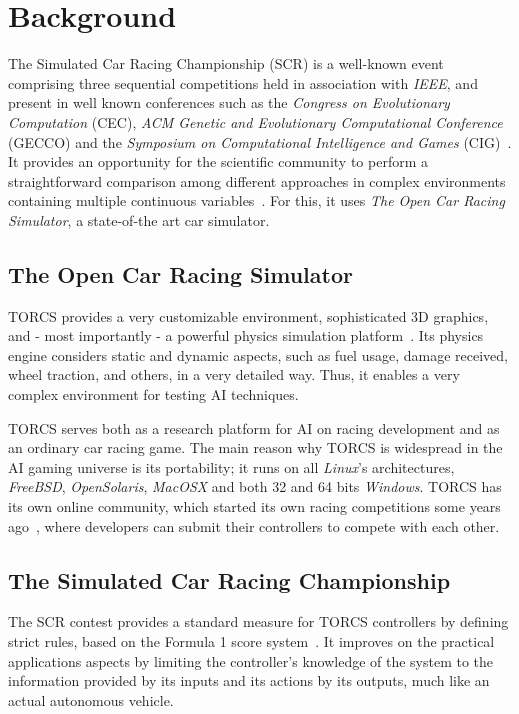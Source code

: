 \section{Background}

The Simulated Car Racing Championship (SCR) is a well-known event comprising 
three sequential competitions held in association with \textit{IEEE}, and 
present in well known conferences such as the \textit{Congress on Evolutionary 
Computation} (CEC), \textit{ACM Genetic and Evolutionary Computational Conference} 
(GECCO) and the \textit{Symposium on Computational Intelligence and Games} 
(CIG)~\cite{scr2009}.  It provides an opportunity for the scientific community 
to perform a straightforward comparison among different approaches in complex 
environments containing multiple continuous variables~\cite{caldeira_2013}. For 
this, it uses \emph{The Open Car Racing Simulator}, a state-of-the art car simulator. 

\subsection{The Open Car Racing Simulator}
TORCS provides a very customizable environment, sophisticated 3D graphics, and -
most importantly - a powerful physics simulation platform~\cite{manual}. Its 
physics engine considers static and dynamic aspects, such as fuel usage, damage 
received, wheel traction, and others, in a very detailed way. Thus, it enables 
a very complex environment for testing AI techniques.

TORCS serves both as a research platform for AI on racing development and as an 
ordinary car racing game. The main reason why TORCS is widespread in the AI gaming 
universe is its portability; it runs on all \textit{Linux}'s architectures,
\textit{FreeBSD}, \textit{OpenSolaris}, \textit{MacOSX} and both 32 and 64 bits 
\textit{Windows}. TORCS has its own online community, which started its own 
racing competitions some years ago~\cite{TORCS}, where developers can submit 
their controllers to compete with each other.


\subsection{The Simulated Car Racing Championship}
The SCR contest provides a standard measure for TORCS controllers by defining strict
rules, based on the Formula 1 score system~\cite{scr2009}. It improves on the 
practical applications aspects by limiting the controller's knowledge of 
the system to the information provided by its inputs and its actions by its outputs,
much like an actual autonomous vehicle.

